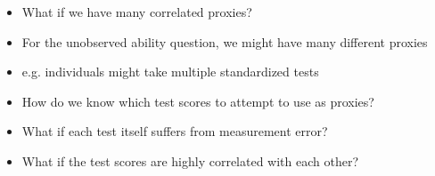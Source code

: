 \documentclass[aspectratio=169]{beamer}
\begin{document}
\begin{frame}
\begin{itemize}
\itemsep1.5em
\item<1-> What if we have many correlated proxies?
\item<2-> For the unobserved ability question, we might have many different proxies
\item<3-> e.g. individuals might take multiple standardized tests
\item<4-> How do we know which test scores to attempt to use as proxies?
\item<5-> What if each test itself suffers from measurement error?
\item<6-> What if the test scores are highly correlated with each other?
\end{itemize}
\end{frame}
\end{document}
